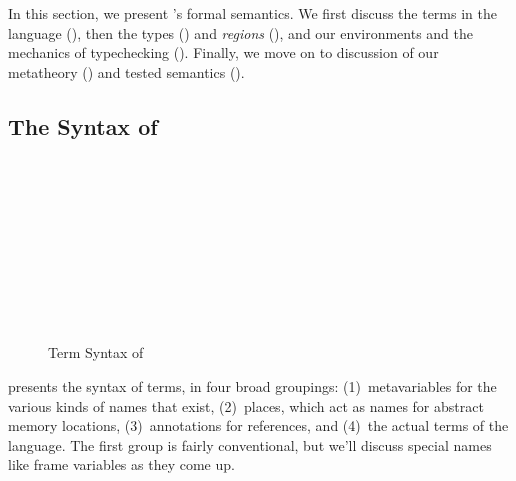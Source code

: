 In this section, we present \lang's formal semantics. We first discuss the terms
in the language (), then the types () and
\emph{regions} (), and our environments and the
mechanics of typechecking (). Finally, we move on to
discussion of our metatheory () and tested semantics
().

\subsection{The Syntax of \lang}
\label{sec:terms}

\begin{figure}
  \figuresize
  \oxnamegrammar

  \begin{minipage}{.43\textwidth}
    \begin{bnf}
      \oxpathgrammar \\
      \oxplacegrammar \\
      \oxplaceexprgrammar \\
      \oxplaceexprctxgrammar \\[1em]

      \oxprovgrammar \\
      \oxmutagrammar \\[1em]
    \end{bnf}
  \end{minipage}
  \begin{minipage}{.56\textwidth}
    \begin{bnf}
      \oxprimitivegrammar \\
      \oxexpressiongrammar \\
    \end{bnf}
  \end{minipage}

  \vspace{-1em}
  \caption{Term Syntax of \lang}
  \label{fig:term-syntax}
  \vspace{-1em}
\end{figure}

 presents the syntax of \lang terms, in four broad
groupings: (1)~metavariables for the various kinds of names that exist,
(2)~places, which act as names for abstract memory locations, 
(3)~annotations for references, and (4)~the actual terms of the language. The
first group is fairly conventional, but we'll discuss special names like
frame variables as they come up.

